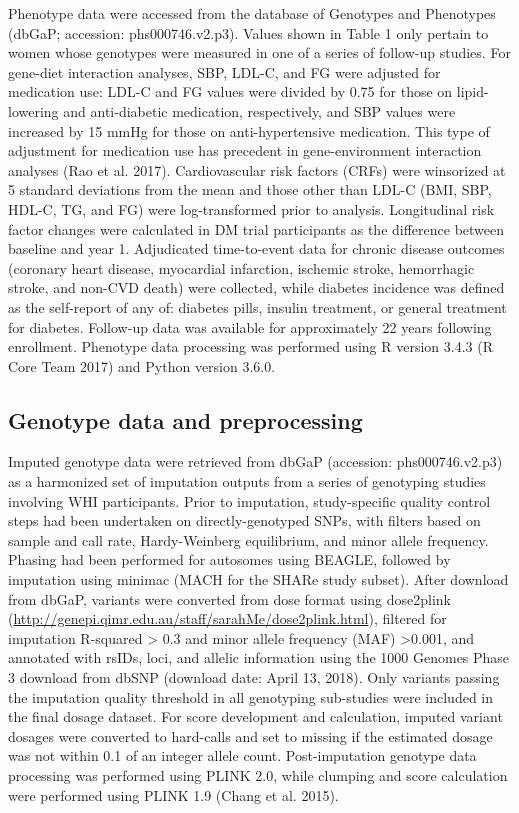 \documentclass[]{article}
\begin{document}
Phenotype data were accessed from the database of Genotypes and
Phenotypes (dbGaP; accession: phs000746.v2.p3). Values shown in Table 1
only pertain to women whose genotypes were measured in one of a series
of follow-up studies. For gene-diet interaction analyses, SBP, LDL-C,
and FG were adjusted for medication use: LDL-C and FG values were
divided by 0.75 for those on lipid-lowering and anti-diabetic
medication, respectively, and SBP values were increased by 15 mmHg for
those on anti-hypertensive medication. This type of adjustment for
medication use has precedent in gene-environment interaction analyses
(Rao et al. 2017). Cardiovascular risk factors (CRFs) were winsorized at
5 standard deviations from the mean and those other than LDL-C (BMI,
SBP, HDL-C, TG, and FG) were log-transformed prior to analysis.
Longitudinal risk factor changes were calculated in DM trial
participants as the difference between baseline and year 1. Adjudicated
time-to-event data for chronic disease outcomes (coronary heart disease,
myocardial infarction, ischemic stroke, hemorrhagic stroke, and non-CVD
death) were collected, while diabetes incidence was defined as the
self-report of any of: diabetes pills, insulin treatment, or general
treatment for diabetes. Follow-up data was available for approximately
22 years following enrollment. Phenotype data processing was performed
using R version 3.4.3 (R Core Team 2017) and Python version 3.6.0.

\hypertarget{genotype-data-and-preprocessing}{%
\subsection{Genotype data and
preprocessing}\label{genotype-data-and-preprocessing}}

Imputed genotype data were retrieved from dbGaP (accession:
phs000746.v2.p3) as a harmonized set of imputation outputs from a series
of genotyping studies involving WHI participants. Prior to imputation,
study-specific quality control steps had been undertaken on
directly-genotyped SNPs, with filters based on sample and call rate,
Hardy-Weinberg equilibrium, and minor allele frequency. Phasing had been
performed for autosomes using BEAGLE, followed by imputation using
minimac (MACH for the SHARe study subset). After download from dbGaP,
variants were converted from dose format using dose2plink
(\url{http://genepi.qimr.edu.au/staff/sarahMe/dose2plink.html}),
filtered for imputation R-squared \textgreater{} 0.3 and minor allele
frequency (MAF) \textgreater{}0.001, and annotated with rsIDs, loci, and
allelic information using the 1000 Genomes Phase 3 download from dbSNP
(download date: April 13, 2018). Only variants passing the imputation
quality threshold in all genotyping sub-studies were included in the
final dosage dataset. For score development and calculation, imputed
variant dosages were converted to hard-calls and set to missing if the
estimated dosage was not within 0.1 of an integer allele count.
Post-imputation genotype data processing was performed using PLINK 2.0,
while clumping and score calculation were performed using PLINK 1.9
(Chang et al. 2015).
\end{document}
